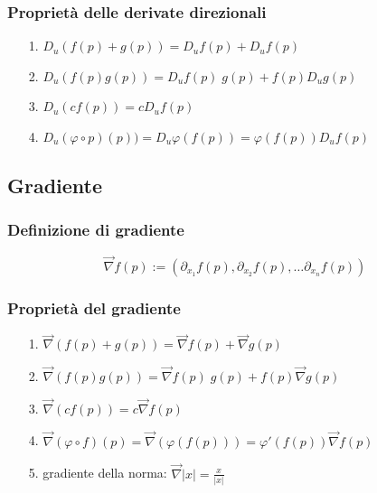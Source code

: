 \documentclass[a4paper]{article}
\newcommand\nab{\vec{\nabla}} %
\begin{document}
\subsubsection*{Proprietà delle derivate direzionali}
\begin{itemize}[topsep=3pt, itemsep=0pt]
	\item[1.] \(D_u (f(p) + g(p)) = D_u f(p) + D_u f(p)\)
	\item[2.] \(D_u (f(p)g(p)) = D_u f(p) \; g(p) + f(p) D_u g(p)\)
	\item[3.] \(D_u (c f(p)) = c D_u f(p)\)
	\item[4.] \(D_u (\varphi \circ p)(p)) = D_u \varphi(f(p)) = \varphi(f(p)) D_u f(p)\)
\end{itemize}

\subsection{Gradiente}
\subsubsection*{Definizione di gradiente}
\[\nab f(p) := \left( \partial_{x_1} f(p), \partial_{x_2} f(p), \dots \partial_{x_n} f(p)\right)\]

\subsubsection*{Proprietà del gradiente} %
\begin{itemize}[topsep=3pt, itemsep=0pt]
	\item[1.] \(\nab (f(p) + g(p)) = \nab f(p) + \nab g(p)\)
	\item[2.] \(\nab (f(p) g(p)) = \nab f(p) \; g(p) + f(p) \nab g(p)\)
	\item[3.] \(\nab (c f(p)) = c \nab f(p)\)
	\item[4.] \(\nab (\varphi \circ f)(p) = \nab (\varphi(f(p))) = \varphi'(f(p)) \nab f(p)\)
	\item[5.] gradiente della norma: \(\displaystyle \nab \left|x\right| = \frac{x}{\left|x\right|}\)
\end{itemize}
\end{document}
